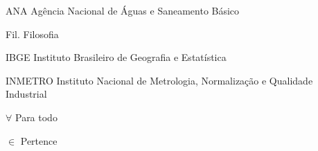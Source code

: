 \documentclass[
        oneside,      %
        english,			
        brazil			 
        ]{abntbibufjf}
\begin{document}

\ilustvaria   %
\listilustvaria  %


\cleardoublepage
{}



\listoftables*    %

\cleardoublepage



\begin{siglas} %
  \item[ANA] Agência Nacional de Águas e Saneamento Básico
  \item[Fil.] Filosofia 
  \item[IBGE] Instituto Brasileiro de Geografia e Estat\'istica 
  \item[INMETRO] Instituto Nacional de Metrologia, Normaliza\c{c}\~ao e Qualidade Industrial
  \end{siglas}


\begin{simbolos} %
  \item[$ \forall $] Para todo
  \item[$ \in $] Pertence
 \end{simbolos}

 

\tableofcontents*
\cleardoublepage
\end{document}
